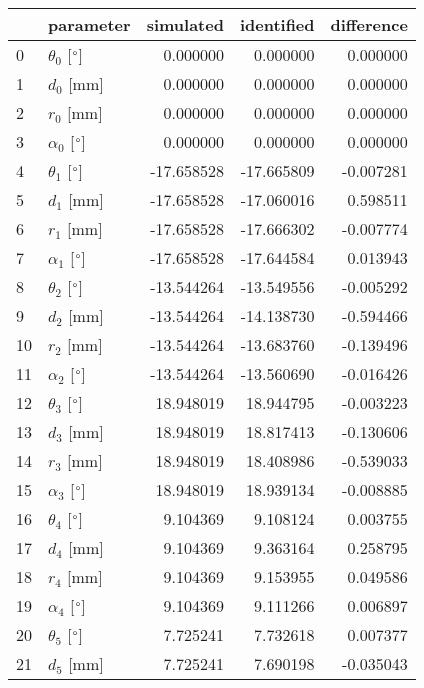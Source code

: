 \documentclass{standalone}%
\begin{document}
%
\normalsize%
\begin{tabular}{llrrr}
\toprule
{} &                 parameter &  simulated & identified & difference \\
\midrule
0  &  $\theta_{0}$ [$\degree$] &   0.000000 &   0.000000 &   0.000000 \\
1  &              $d_{0}$ [mm] &   0.000000 &   0.000000 &   0.000000 \\
2  &              $r_{0}$ [mm] &   0.000000 &   0.000000 &   0.000000 \\
3  &  $\alpha_{0}$ [$\degree$] &   0.000000 &   0.000000 &   0.000000 \\
4  &  $\theta_{1}$ [$\degree$] & -17.658528 & -17.665809 &  -0.007281 \\
5  &              $d_{1}$ [mm] & -17.658528 & -17.060016 &   0.598511 \\
6  &              $r_{1}$ [mm] & -17.658528 & -17.666302 &  -0.007774 \\
7  &  $\alpha_{1}$ [$\degree$] & -17.658528 & -17.644584 &   0.013943 \\
8  &  $\theta_{2}$ [$\degree$] & -13.544264 & -13.549556 &  -0.005292 \\
9  &              $d_{2}$ [mm] & -13.544264 & -14.138730 &  -0.594466 \\
10 &              $r_{2}$ [mm] & -13.544264 & -13.683760 &  -0.139496 \\
11 &  $\alpha_{2}$ [$\degree$] & -13.544264 & -13.560690 &  -0.016426 \\
12 &  $\theta_{3}$ [$\degree$] &  18.948019 &  18.944795 &  -0.003223 \\
13 &              $d_{3}$ [mm] &  18.948019 &  18.817413 &  -0.130606 \\
14 &              $r_{3}$ [mm] &  18.948019 &  18.408986 &  -0.539033 \\
15 &  $\alpha_{3}$ [$\degree$] &  18.948019 &  18.939134 &  -0.008885 \\
16 &  $\theta_{4}$ [$\degree$] &   9.104369 &   9.108124 &   0.003755 \\
17 &              $d_{4}$ [mm] &   9.104369 &   9.363164 &   0.258795 \\
18 &              $r_{4}$ [mm] &   9.104369 &   9.153955 &   0.049586 \\
19 &  $\alpha_{4}$ [$\degree$] &   9.104369 &   9.111266 &   0.006897 \\
20 &  $\theta_{5}$ [$\degree$] &   7.725241 &   7.732618 &   0.007377 \\
21 &              $d_{5}$ [mm] &   7.725241 &   7.690198 &  -0.035043 \\

\end{tabular}
\end{document}
